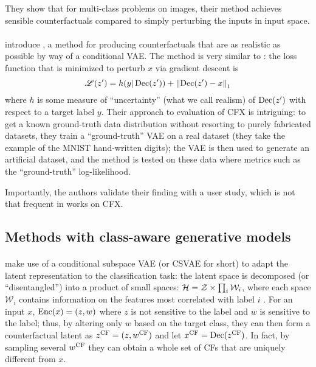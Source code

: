 \documentclass[../main.tex]{subfiles}
\begin{document}
They show that for multi-class problems on images, their method achieves sensible counterfactuals compared to simply perturbing the inputs in input space.

\paragraph{}

\citeauthor{antoranGetting2021} introduce  \cite{antoranGetting2021}, a method for producing counterfactuals that are as realistic as possible by way of a conditional VAE. The method is very similar to \revise: the loss function that is minimized to perturb $x$ via gradient descent is
\begin{equation}
    \mathscr{L}(z') = h(y | \operatorname{Dec}(z')) + \left\lVert\operatorname{Dec}(z') - x\right\rVert_1
\end{equation}
where $h$ is some measure of ``uncertainty'' (what we call realism) of $\operatorname{Dec}(z')$ with respect to a target label $y$.
Their approach to evaluation of CFX is intriguing:
to get a known ground-truth data distribution without resorting to purely fabricated datasets, they train a ``ground-truth'' VAE on a real dataset (they take the example of the MNIST hand-written digits); the VAE is then used to generate an artificial dataset, and the method is tested on these data where metrics such as the ``ground-truth'' log-likelihood.

Importantly, the authors validate their finding with a user study, which is not that frequent in works on CFX.

\subsection{Methods with class-aware generative models}

\paragraph{}

\citeauthor{downsCRUDS2020} make use of a conditional subspace VAE (or CSVAE for short) to adapt the latent representation to the classification task:
the latent space is decomposed (or ``disentangled'') into a product of small spaces: $\mathcal{H} = \mathcal{Z} \times \prod_{i} \mathcal{W}_i$, where each space $\mathcal{W}_i$ contains information on the features most correlated with label $i$ \cite{klysLearning2018}.
For an input $x$, $\operatorname{Enc}(x) = (z, w)$ where $z$ is not sensitive to the label and $w$ is sensitive to the label; thus, by altering only $w$ based on the target class, they can then form a counterfactual latent as $z^\mathrm{CF} = (z, w^\mathrm{CF})$ and let $x^\mathrm{CF} = \operatorname{Dec}(z^\mathrm{CF})$.
In fact, by sampling several $w^\mathrm{CF}$ they can obtain a whole set of CFs that are uniquely different from $x$.
\end{document}
